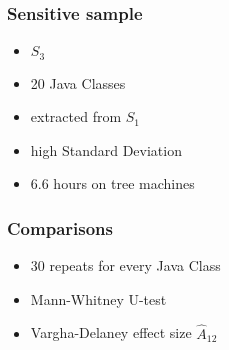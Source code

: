 \begin{frame}
	\frametitle{Sensitive sample}
	
	\begin{itemize}
		\item $S_3$
		\item 20 Java Classes
		\item extracted from $S_1$
		\item high Standard Deviation
		\item 6.6 hours on tree machines
	\end{itemize}
	
\end{frame}

\begin{frame}
	\frametitle{Comparisons}
	
	\begin{itemize}
		\item 30 repeats for every Java Class
		\item Mann-Whitney U-test
		\item Vargha-Delaney effect size $\hat{A}_{12}$
	\end{itemize}
	
\end{frame}

